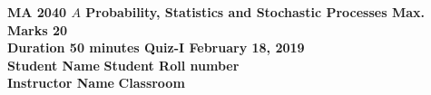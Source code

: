 \documentclass[11pt]{article}
\begin{document}
	\doublespacing
	\noindent
	\textbf{MA 2040 $\boxed{A}$ \hspace{5em} Probability, Statistics and Stochastic Processes \hspace{4em} Max. Marks 20}\\
	\noindent\textbf{Duration 50 minutes \hspace{10em} Quiz-I \hfill February 18, 2019}\\
	\noindent\textbf{Student Name} \underline{\hspace{20em}} \hfill \textbf{Student Roll number} \underline{\hspace{10em}}\\
	\noindent\textbf{Instructor Name} \underline{\hspace{20em}} \hfill \textbf{Classroom} \underline{\hspace{10em}}
\end{document}
